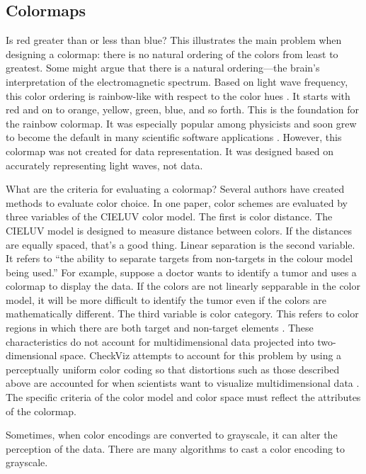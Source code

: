 \documentclass[journal,12pt]{IEEEtran}
\begin{document}
\subsection{Colormaps}

Is red greater than or less than blue? This illustrates the main problem when designing a colormap: there is no natural ordering of the colors
from least to greatest. Some might argue that there is a natural
ordering---the brain's interpretation of the electromagnetic spectrum.
Based on light wave frequency, this color ordering is rainbow-like with respect
to the color hues \cite{colormapping}. It starts with red and on to orange,
yellow, green, blue, and so forth. This is the foundation for the rainbow colormap.
It was especially popular among physicists and soon grew to become the default
in many scientific software applications \cite{rainbowstill,matlab}. However,
this colormap was not created for data representation. It was designed based
on accurately representing light waves, not data.

What are the criteria for evaluating a colormap? Several authors have created
methods to evaluate color
choice. In one paper, color schemes are evaluated by
three variables of the CIELUV color model. The first
is color distance. The CIELUV model is designed to
measure distance between colors. If the distances are
equally spaced, that’s a good thing. Linear separation
is the second variable. It refers to “the ability to separate targets
from non-targets in the colour model being
used.” For example, suppose a doctor wants to identify
a tumor and uses a colormap to display the data. If the
colors are not linearly sepparable in the color model, it
will be more difficult to identify the tumor even if the
colors are mathematically different. The third variable
is color category. This refers to color regions in which
there are both target and non-target elements \cite{colorchoice}.
 These characteristics do not account for multidimensional data projected into two-dimensional
space. CheckViz attempts to account for this problem
by using a perceptually uniform color coding so that
distortions such as those described above are accounted for when 
scientists want to visualize multidimensional data \cite{checkviz}.
The specific criteria of the color
model and color space must reflect the attributes of the colormap.
\par
Sometimes, when color encodings are converted to
grayscale, it can alter the perception of the data. There
are many algorithms to cast a color encoding to grayscale.
\end{document}
